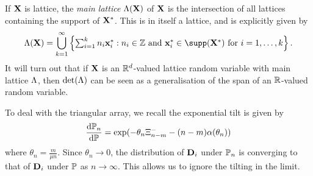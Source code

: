 If $\vX$ is lattice, the \emph{main lattice} $\lattice(\vX)$ of $\vX$ is the intersection of all lattices containing the support of $\vX^*$. This is in itself a lattice, and is explicitly given by
\begin{equation*}
    \lattice(\vX) = \bigcup_{k=1}^{\infty} \left\{ 
        \textstyle \sum_{i=1}^k n_i \vx^*_i : \text{$n_i \in \Z$ and $\vx^*_i \in \supp(\vX^*)$ for $i = 1, \ldots, k$}
    \right\}.
\end{equation*}
It will turn out that if $\vX$ is an $\R^d$-valued lattice random variable with main lattice $\lattice$, then $\det(\lattice)$ can be seen as a generalisation of the span of an $\R$-valued random variable.

To deal with the triangular array, we recall the exponential tilt is given by
\begin{equation*}
    \frac{\dif \P_n}{\dif \P} = \exp(
        - \theta_n \Xi^-_{n-m} - (n - m) \alpha(\theta_n)
    )
\end{equation*}
where $\theta_n = \frac{m}{\mu n}$. Since $\theta_n \to 0$, the distribution of $\vD_i$ under $\P_n$ is converging to that of $\vD_i$ under $\P$ as $n \to \infty$. This allows us to ignore the tilting in the limit.

